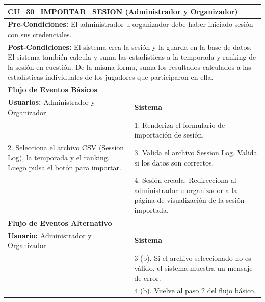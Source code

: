 \begin{center}
  \begin{tabular}{| p{7.5cm} | p{7.5cm} |}
    \hline
    \multicolumn{2}{|p{15cm}|}{\textbf{CU\_30\_IMPORTAR\_SESION} (Administrador y Organizador)} \\ \hline
    \multicolumn{2}{|p{15cm}|}{\textbf{Pre-Condiciones:} El administrador u organizador debe haber iniciado sesión con sus credenciales.} \\ \hline
    \multicolumn{2}{|p{15cm}|}{\textbf{Post-Condiciones:} El sistema crea la sesión y la guarda en la base de datos. El sistema también calcula y suma las estadísticas a la temporada y ranking de la sesión en cuestión. De la misma forma, suma los resultados calculados a las estadísticas individuales de los jugadores que participaron en ella.} \\ \hline
    \multicolumn{2}{|p{7.5cm}|}{\textbf{Flujo de Eventos Básicos}} \\ \hline
    \multicolumn{1}{|p{7.5cm}|}{\textbf{Usuarios:} Administrador y Organizador} & \multicolumn{1}{|p{7.5cm}|}{\textbf{Sistema}} \\ \hline
    
    \multicolumn{1}{|p{7.5cm}|}{} & 
    \multicolumn{1}{|p{7.5cm}|}{1. Renderiza el formulario de importación de sesión.}\\ \hline
    
    \multicolumn{1}{|p{7.5cm}|}{2. Selecciona el archivo CSV (Session Log), la temporada y el ranking. Luego pulsa el botón para importar.}& 
    \multicolumn{1}{|p{7.5cm}|}{3. Valida el archivo Session Log. Valida si los datos son correctos.}\\ \hline
    
    \multicolumn{1}{|p{7.5cm}|}{} & 
    \multicolumn{1}{|p{7.5cm}|}{4. Sesión creada. Redirecciona al administrador u organizador a la página de visualización de la sesión importada.}\\ \hline
    
    \multicolumn{2}{|p{7.5cm}|}{\textbf{Flujo de Eventos Alternativo}} \\ \hline
    
    \multicolumn{1}{|p{7.5cm}|}{\textbf{Usuario:} Administrador y Organizador} & \multicolumn{1}{|p{7.5cm}|}{\textbf{Sistema}} \\ \hline
    
    \multicolumn{1}{|p{7.5cm}|}{} & 
    \multicolumn{1}{|p{7.5cm}|}{3 (b). Si el archivo seleccionado no es válido, el sistema muestra un mensaje de error.}\\ \hline
    
    \multicolumn{1}{|p{7.5cm}|}{} & 
    \multicolumn{1}{|p{7.5cm}|}{4 (b). Vuelve al paso 2 del flujo básico.}\\ \hline
  \end{tabular}
\end{center}

